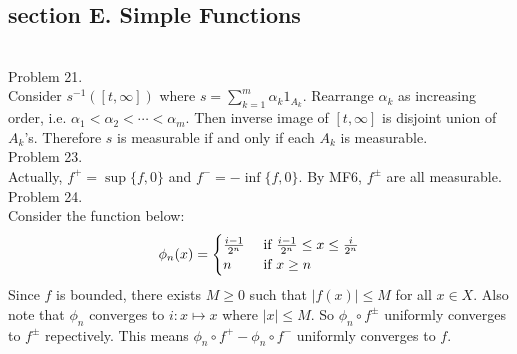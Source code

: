 \subsection*{section E. Simple Functions} \hfill \\

Problem 21. \\

Consider $s^{-1}(\left [ t, \infty \right ] )$ where $s = \sum_{k=1}^{m}\alpha_k 1_{A_k}$. Rearrange $\alpha_k$ as increasing order, i.e. $\alpha_1 < \alpha_2 < \cdots < \alpha_m$. Then inverse image of $\left [ t, \infty \right ]$ is disjoint union of $A_k$'s. Therefore $s$ is measurable if and only if each $A_k$ is measurable. \\

Problem 23. \\

Actually, $f^{+} = \sup \{ f, 0\}$ and $f^{-} = - \inf \{ f, 0 \}$. By MF6, $f^{\pm}$ are all measurable. \\

Problem 24. \\

Consider the function below:
\begin{equation*}
	\phi_n (x) = 
	\begin{cases}
		{i-1 \over 2^{n} } & \text{ if } {i-1 \over 2^{n}} \leq x \leq {i \over 2^{n}} \\
		n & \text{ if } x \geq n
	\end{cases}
\end{equation*}
Since $f$ is bounded, there exists $M \geq 0$ such that $ \lvert f(x) \rvert \leq M$ for all $x \in X$. Also note that $\phi_n$ converges to $i: x \mapsto x$ where $ \lvert x \rvert \leq M$. So $\phi_n \circ f^{\pm}$ uniformly converges to $f^{\pm}$ repectively. This means $\phi_n \circ f^{+} - \phi_n \circ f^{-}$ uniformly converges to $f$. \\


